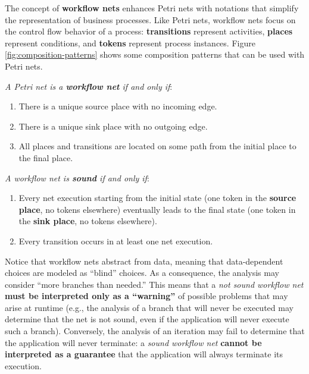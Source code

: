 The concept of \textbf{workflow nets} enhances Petri nets with notations that simplify the representation of business processes. Like Petri nets, workflow nets focus on the control flow behavior of a process: \textbf{transitions} represent activities, \textbf{places} represent conditions, and \textbf{tokens} represent process instances. Figure \ref{fig:composition-patterns} shows some composition patterns that can be used with Petri nets.

\noindent \textit{A Petri net is a \textbf{workflow net} if and only if}:
\begin{enumerate}
    \item There is a unique source place with no incoming edge.
    \item There is a unique sink place with no outgoing edge.
    \item All places and transitions are located on some path from the initial place to the final place.
\end{enumerate}

\noindent \textit{A workflow net is \textbf{sound} if and only if}:
\begin{enumerate}
    \item Every net execution starting from the initial state (one token in the \textbf{source place}, no tokens elsewhere) eventually leads to the final state (one token in the \textbf{sink place}, no tokens elsewhere).
    \item Every transition occurs in at least one net execution.
\end{enumerate}

Notice that workflow nets abstract from data, meaning that data-dependent choices are modeled as ``blind'' choices. As a consequence, the analysis may consider “more branches than needed.” This means that a \textit{not sound workflow net} \textbf{must be interpreted only as a “warning”} of possible problems that may arise at runtime (e.g., the analysis of a branch that will never be executed may determine that the net is not sound, even if the application will never execute such a branch). \newline \noindent Conversely, the analysis of an iteration may fail to determine that the application will never terminate: a \textit{sound workflow net} \textbf{cannot be interpreted as a guarantee} that the application will always terminate its execution.

